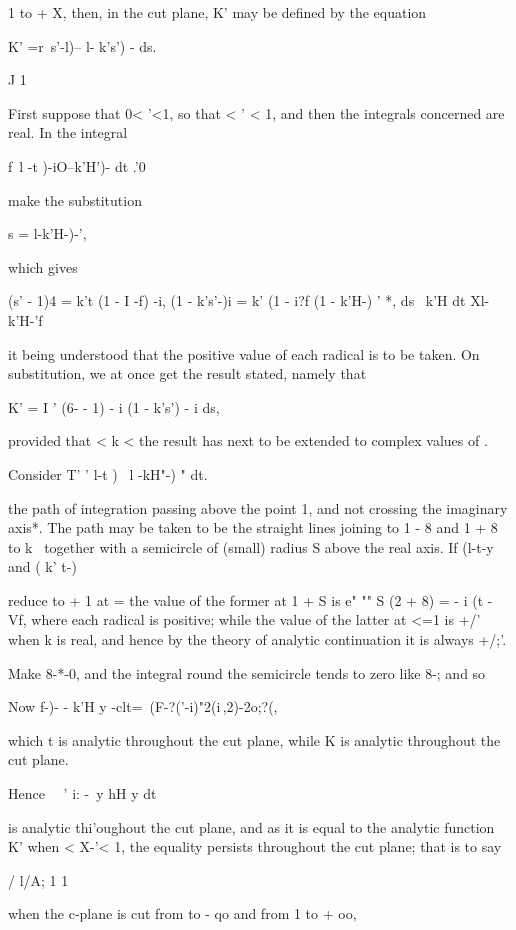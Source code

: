 1 to + X, then, in the cut plane, K' may be defined by the equation

K' =r\ s'-l)-- l- k's') - ds.

J 1

First suppose that 0< '<1, so that < ' < 1, and then the integrals
concerned are real. In the integral

f\ l -t )-iO--k'H')- dt .'0

make the substitution

s = l-k'H-)-',

which gives

(s' - 1)4 = k't (1 - I -f) -i, (1 - k's'-)i = k' (1 - i?f (1 - k'H-) '
*, ds \ k'H dt Xl-k'H-'f

it being understood that the positive value of each radical is to be
taken. On substitution, we at once get the result stated, namely that

K' = I ' (6- - 1) - i (1 - k's') - i ds,

provided that < k <\; the result has next to be extended to complex
values of .

%
%

Consider T' ' l-t )~ l -kH"-) " dt.

the path of integration passing above the point 1, and not crossing
the imaginary axis*. The path may be taken to be the straight lines
joining to 1 - 8 and 1 + 8 to k~ together with a semicircle of (small)
radius S above the real axis. If (l-t-y and ( k' t-)

reduce to + 1 at = the value of the former at 1 + S is e" "" S (2 + 8)
= - i (t - Vf, where each radical is positive; while the value of the
latter at <=1 is +/' when k is real, and hence by the theory of
analytic continuation it is always +/;'.

Make 8-*-0, and the integral round the semicircle tends to zero like
8-; and so

Now f-)- - k'H y -clt=\ (F-?('-i)"2(i\,,2)-2o;?(,

which t is analytic throughout the cut plane, while K is analytic
throughout the cut plane.

Hence \ \ ' i: -\ y hH y dt

is analytic thi'oughout the cut plane, and as it is equal to the
analytic function K' when < X-'< 1, the equality persists throughout
the cut plane; that is to say

/ l/A; 1 1

when the c-plane is cut from to - qo and from 1 to + oo,

